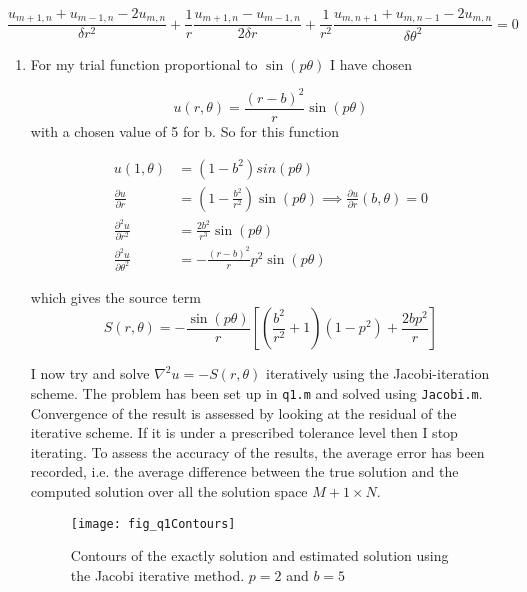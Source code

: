 \documentclass{article}
\begin{document}
\begin{equation}
	\frac{u_{m+1,n} + u_{m-1,n} - 2u_{m,n}}{\delta r^2} + \frac{1}{r}\frac{u_{m+1,n} - u_{m-1,n}}{2\delta r} + \frac{1}{r^2}\frac{u_{m,n+1} + u_{m,n-1} - 2u_{m,n}}{\delta \theta^2} = 0
\end{equation}

\begin{enumerate}
	\item For my trial function proportional to $\sin(p\theta)$ I have chosen
	
	\begin{equation}
		u(r, \theta) = \frac{(r-b)^2}{r} \sin(p \theta)
	\end{equation}
	with a chosen value of 5 for b.
	So for this function 
	
	\begin{equation*}
	\begin{split}
		u(1,\theta) &= (1-b^2) sin(p \theta) \\
		\frac{\partial u}{\partial r} &= (1-\frac{b^2}{r^2}) \sin(p \theta) \implies \frac{\partial u}{\partial r} (b, \theta) = 0 \\
		 \frac{\partial^2 u}{\partial r^2} &= \frac{2b^2}{r^3} \sin(p \theta) \\
		\frac{\partial^2 u}{\partial \theta^2} &= -\frac{(r-b)^2}{r}p^2 \sin(p\theta)
	\end{split}
	\end{equation*}
	
	which gives the source term
	\begin{equation*}
		S(r,\theta) = - \frac{\sin(p \theta)}{r} [ (\frac{b^2}{r^2} + 1)(1 - p^2) + \frac{2bp^2}{r} ] 
	\end{equation*}
	
	I now try and solve $\nabla^2 u = -S(r,\theta)$ iteratively using the Jacobi-iteration scheme. The problem has been set up in \texttt{q1.m} and solved using \texttt{Jacobi.m}. Convergence of the result is assessed by looking at the residual of the iterative scheme. If it is under a prescribed tolerance level then I stop iterating. To assess the accuracy of the results, the average error has been recorded, i.e. the average difference between the true solution and the computed solution over all the solution space $M+1 \times N$.
	
	\begin{figure}[h!]
		\centering
		\texttt{[image: fig\_q1Contours]}
		\caption{Contours of the exactly solution and estimated solution using the Jacobi iterative method. $p=2$ and $b=5$}
	\end{figure}
	

\end{enumerate}
\end{document}
